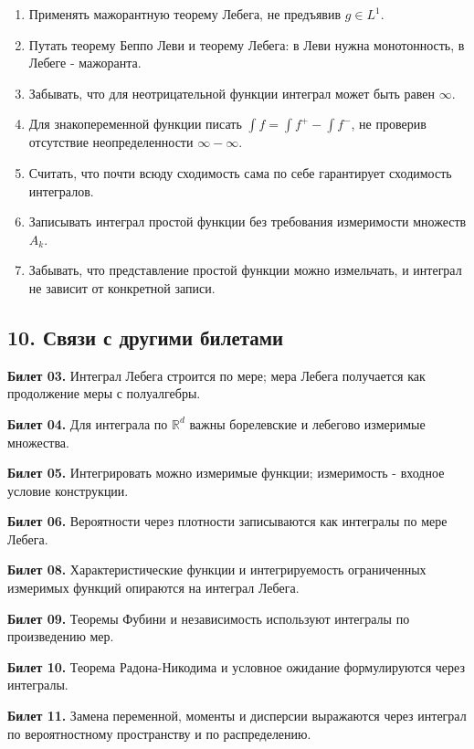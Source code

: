 \documentclass[
  11pt,
  a4paper,
]{article}
\begin{document}
\begin{enumerate}
\def\labelenumi{\arabic{enumi}.}
\item
  Применять мажорантную теорему Лебега, не предъявив \(g\in L^1\).
\item
  Путать теорему Беппо Леви и теорему Лебега: в Леви нужна монотонность,
  в Лебеге - мажоранта.
\item
  Забывать, что для неотрицательной функции интеграл может быть равен
  \(\infty\).
\item
  Для знакопеременной функции писать \(\int f=\int f^+-\int f^-\), не
  проверив отсутствие неопределенности \(\infty-\infty\).
\item
  Считать, что почти всюду сходимость сама по себе гарантирует
  сходимость интегралов.
\item
  Записывать интеграл простой функции без требования измеримости
  множеств \(A_k\).
\item
  Забывать, что представление простой функции можно измельчать, и
  интеграл не зависит от конкретной записи.
\end{enumerate}

\subsection{10. Связи с другими
билетами}\label{ux441ux432ux44fux437ux438-ux441-ux434ux440ux443ux433ux438ux43cux438-ux431ux438ux43bux435ux442ux430ux43cux438}

\textbf{Билет 03.} Интеграл Лебега строится по мере; мера Лебега
получается как продолжение меры с полуалгебры.

\textbf{Билет 04.} Для интеграла по \(\mathbb R^d\) важны борелевские и
лебегово измеримые множества.

\textbf{Билет 05.} Интегрировать можно измеримые функции; измеримость -
входное условие конструкции.

\textbf{Билет 06.} Вероятности через плотности записываются как
интегралы по мере Лебега.

\textbf{Билет 08.} Характеристические функции и интегрируемость
ограниченных измеримых функций опираются на интеграл Лебега.

\textbf{Билет 09.} Теоремы Фубини и независимость используют интегралы
по произведению мер.

\textbf{Билет 10.} Теорема Радона-Никодима и условное ожидание
формулируются через интегралы.

\textbf{Билет 11.} Замена переменной, моменты и дисперсии выражаются
через интеграл по вероятностному пространству и по распределению.
\end{document}
